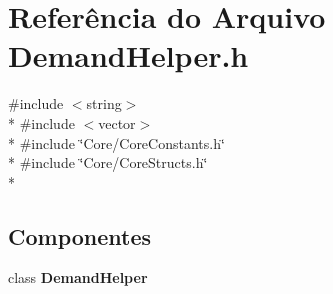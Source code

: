 \section{Referência do Arquivo Demand\+Helper.\+h}
\label{_demand_helper_8h}
{\ttfamily \#include $<$string$>$}\\*
{\ttfamily \#include $<$vector$>$}\\*
{\ttfamily \#include \char`\"{}Core/\+Core\+Constants.\+h\char`\"{}}\\*
{\ttfamily \#include \char`\"{}Core/\+Core\+Structs.\+h\char`\"{}}\\*
\subsection*{Componentes}
\begin{DoxyCompactItemize}
\item 
class {\bf Demand\+Helper}
\end{DoxyCompactItemize}
